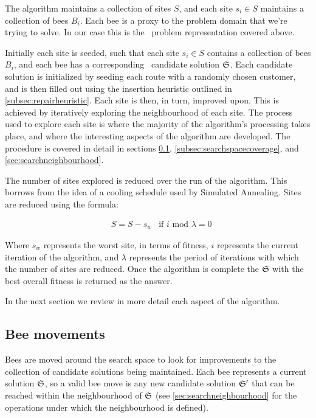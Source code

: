 The algorithm maintains a collection of sites $S$, and each site $s_i \in S$ maintains a collection of bees $B_i$. Each bee is a proxy to the problem domain that we're trying to solve. In our case this is the \VRP\ problem representation covered above.

Initially each site is seeded, such that each site $s_i \in S$ contains a collection of bees $B_i$, and each bee has a corresponding \VRP\ candidate solution $\mathfrak{S}$. Each candidate solution is initialized by seeding each route with a randomly chosen customer, and is then filled out using the insertion heuristic outlined in \ref{subsec:repairheuristic}. Each site is then, in turn, improved upon. This is achieved by iteratively exploring the neighbourhood of each site. The process used to explore each site is where the majority of the algorithm's processing takes place, and where the interesting aspects of the algorithm are developed. The procedure is covered in detail in sections \ref{sec:beemovement}, \ref{subsec:searchspacecoverage}, and \ref{sec:searchneighbourhood}.

The number of sites explored is reduced over the run of the algorithm. This borrows from the idea of a cooling schedule used by Simulated Annealing. Sites are reduced using the formula:

\begin{align}
   & S = S - s_w & \text{if $i \text{ mod } \lambda = 0$}
\end{align}

Where $s_w$ represents the worst site, in terms of fitness, $i$ represents the current iteration of the algorithm, and $\lambda$ represents the period of iterations with which the number of sites are reduced. Once the algorithm is complete the $\mathfrak{S}$ with the best overall fitness is returned as the answer.

In the next section we review in more detail each aspect of the algorithm. 

\subsection{Bee movements}
\label{sec:beemovement}

Bees are moved around the search space to look for improvements to the collection of candidate solutions being maintained. Each bee represents a current solution $\mathfrak{S}$, so a valid bee move is any new candidate solution $\mathfrak{S}'$ that can be reached within the neighbourhood of $\mathfrak{S}$ (see \ref{sec:searchneighbourhood} for the operations under which the neighbourhood is defined).

